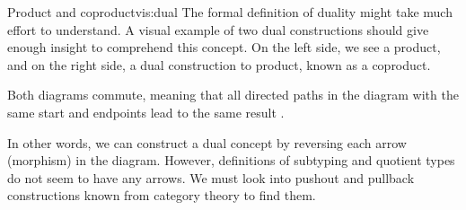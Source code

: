 \begin{vis}[]{Product and coproduct}{vis:dual}
The formal definition of duality might take much effort to understand. A visual example of two dual constructions should give enough insight to comprehend this concept. On the left side, we see a product, and on the right side, a dual construction to product, known as a coproduct.
\begin{center}
\end{center}
Both diagrams commute, meaning that all directed paths in the diagram with the same start and endpoints lead to the same result \cite{CategoryTheory}.
\end{vis}
In other words, we can construct a dual concept by reversing each arrow (morphism) in the diagram. However, definitions of subtyping and quotient types
do not seem to have any arrows. We must look into pushout and pullback constructions known from category theory \cite{CategoryTheory} to find them.
